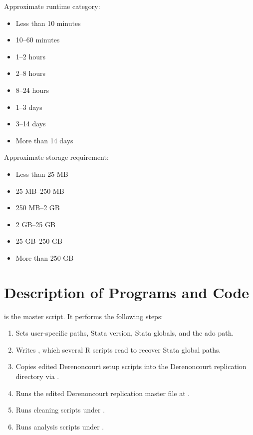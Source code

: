 \documentclass[11pt]{article}
\begin{document}
Approximate runtime category:

\begin{itemize}
  \item[$\square$] Less than 10 minutes
  \item[$\square$] 10--60 minutes
  \item[$\square$] 1--2 hours
  \item[$\square$] 2--8 hours
  \item[$\square$] 8--24 hours
  \item[$\square$] 1--3 days
  \item[$\square$] 3--14 days
  \item[$\square$] More than 14 days
\end{itemize}

Approximate storage requirement:

\begin{itemize}
  \item[$\square$] Less than 25 MB
  \item[$\square$] 25 MB--250 MB
  \item[$\square$] 250 MB--2 GB
  \item[$\square$] 2 GB--25 GB
  \item[$\rlap{$\checkmark$}\square$] 25 GB--250 GB
  \item[$\square$] More than 250 GB
\end{itemize}

\section*{Description of Programs and Code}

 is the master script. It performs the following steps:

\begin{enumerate}
  \item Sets user-specific paths, Stata version, Stata globals, and the ado path.
  \item Writes , which several R scripts read to recover Stata global paths.
  \item Copies edited Derenoncourt setup scripts into the Derenoncourt replication directory via .
  \item Runs the edited Derenoncourt replication master file at .
  \item Runs cleaning scripts under .
  \item Runs analysis scripts under .
\end{enumerate}
\end{document}

